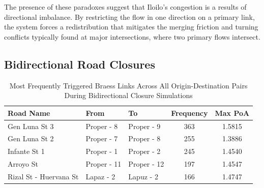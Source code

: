 The presence of these paradoxes suggest that Iloilo's congestion is a results of directional imbalance. By restricting the flow in one direction on a primary link, the system forces a redistribution that mitigates the merging friction and turning conflicts typically found at major intersections, where two primary flows intersect.

\subsection{Bidirectional Road Closures}
\label{sec:bidirectional_closures}


\begin{table}[H]
    \centering
    \renewcommand{\thetable}{5.1b}

    \begin{tabular}{|l|l|l|c|c|}
    \hline
    \textbf{Road Name} & \textbf{From} & \textbf{To} & \textbf{Frequency} & \textbf{Max PoA} \\ \hline
    Gen Luna St 3 & Proper - 8 & Proper - 9 & 363 & 1.5815 \\ \hline
    Gen Luna St 2 & Proper - 7 & Proper - 8 & 255 & 1.3886 \\ \hline
    Infante St 1 & Proper - 1 & Proper - 2 & 245 & 1.4540 \\ \hline
    Arroyo St & Proper - 11 & Proper - 12 & 197 & 1.4547 \\ \hline
    Rizal St - Huervana St & Lapaz - 2 & Lapuz - 2 & 166 & 1.4747 \\ \hline
    \end{tabular}
    \caption{Most Frequently Triggered Braess Links Across All Origin-Destination Pairs During Bidirectional Closure Simulations}
    \label{tab:5.1b}
\end{table}

